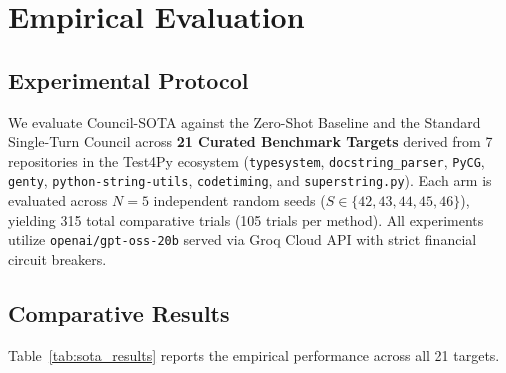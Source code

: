 \documentclass[conference]{IEEEtran}
\begin{document}
\section{Empirical Evaluation}
\subsection{Experimental Protocol}
We evaluate Council-SOTA against the Zero-Shot Baseline and the Standard Single-Turn Council across \textbf{21 Curated Benchmark Targets} derived from 7 repositories in the Test4Py ecosystem (\texttt{typesystem}, \texttt{docstring\_parser}, \texttt{PyCG}, \texttt{genty}, \texttt{python-string-utils}, \texttt{codetiming}, and \texttt{superstring.py}). Each arm is evaluated across $N=5$ independent random seeds ($S \in \{42, 43, 44, 45, 46\}$), yielding 315 total comparative trials (105 trials per method). All experiments utilize \texttt{openai/gpt-oss-20b} served via Groq Cloud API with strict financial circuit breakers.

\subsection{Comparative Results}
Table~\ref{tab:sota_results} reports the empirical performance across all 21 targets.
\end{document}
